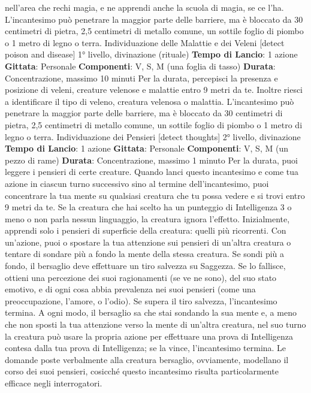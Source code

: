 \begin{multicols}{2}
nell’area che rechi magia, e ne apprendi anche la
scuola di magia, se ce l’ha.
L’incantesimo può penetrare la maggior parte delle
barriere, ma è bloccato da 30 centimetri di pietra, 2,5
centimetri di metallo comune, un sottile foglio di piombo
o 1 metro di legno o terra.
Individuazione delle Malattie e dei Veleni
[detect poison and disease]
1° livello, divinazione (rituale)
\textbf{Tempo di Lancio}: 1 azione
\textbf{Gittata}: Personale
\textbf{Componenti}: V, S, M (una foglia di tasso)
\textbf{Durata}: Concentrazione, massimo 10 minuti
Per la durata, percepisci la presenza e posizione di
veleni, creature velenose e malattie entro 9 metri da te.
Inoltre riesci a identificare il tipo di veleno, creatura
velenosa o malattia.
L’incantesimo può penetrare la maggior parte delle
barriere, ma è bloccato da 30 centimetri di pietra, 2,5
centimetri di metallo comune, un sottile foglio di piombo
o 1 metro di legno o terra.
Individuazione dei Pensieri
[detect thoughts]
2° livello, divinazione
\textbf{Tempo di Lancio}: 1 azione
\textbf{Gittata}: Personale
\textbf{Componenti}: V, S, M (un pezzo di rame)
\textbf{Durata}: Concentrazione, massimo 1 minuto
Per la durata, puoi leggere i pensieri di certe creature.
Quando lanci questo incantesimo e come tua azione in
ciascun turno successivo sino al termine
dell’incantesimo, puoi concentrare la tua mente su
qualsiasi creatura che tu possa vedere e si trovi entro 9
metri da te. Se la creatura che hai scelto ha un
punteggio di Intelligenza 3 o meno o non parla nessun
linguaggio, la creatura ignora l’effetto.
Inizialmente, apprendi solo i pensieri di superficie della
creatura: quelli più ricorrenti. Con un’azione, puoi o
spostare la tua attenzione sui pensieri di un’altra
creatura o tentare di sondare più a fondo la mente della
stessa creatura. Se sondi più a fondo, il bersaglio deve
effettuare un tiro salvezza su Saggezza. Se lo fallisce,
ottieni una percezione dei suoi ragionamenti (se ve ne
sono), del suo stato emotivo, e di ogni cosa abbia
prevalenza nei suoi pensieri (come una
preoccupazione, l’amore, o l’odio). Se supera il tiro
salvezza, l’incantesimo termina. A ogni modo, il
bersaglio sa che stai sondando la sua mente e, a meno
che non sposti la tua attenzione verso la mente di
un’altra creatura, nel suo turno la creatura può usare la
propria azione per effettuare una prova di Intelligenza
contesa dalla tua prova di Intelligenza; se la vince,
l’incantesimo termina.
Le domande poste verbalmente alla creatura bersaglio,
ovviamente, modellano il corso dei suoi pensieri,
cosicché questo incantesimo risulta particolarmente
efficace negli interrogatori.

\end{multicols}
